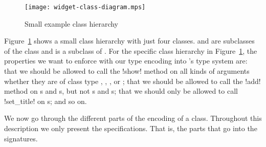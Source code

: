 \documentclass[workingdraft]{usetex-v1}
\begin{document}
\begin{figure}[htp]
  \centering
  \texttt{[image: widget-class-diagram.mps]}
  \caption{Small example class hierarchy}
  \label{fig:class-hierarchy}
\end{figure}

Figure~\ref{fig:class-hierarchy} shows a small class hierarchy with
just four classes.  and  are
subclasses of the class  and  is a
subclass of .  For the specific class hierarchy
in Figure~\ref{fig:class-hierarchy}, the properties we want to enforce
with our type encoding into \sml's type system are: that we should be
allowed to call the !show! method on all kinds of arguments whether
they are of class type , ,
, or ; that we should be
allowed to call the !add! method on s and
s, but not s and
s; that we should only be allowed to call !set_title!
on s; and so on.

We now go through the different parts of the encoding of a class.
Throughout this description we only present the \sml specifications.
That is, the parts that go into the signatures.
\end{document}
